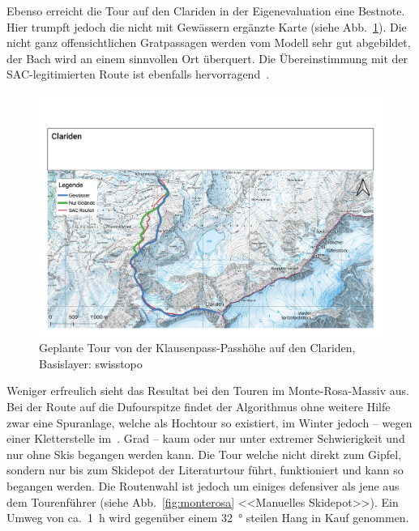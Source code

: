 
Ebenso erreicht die Tour auf den Clariden in der Eigenevaluation eine Bestnote. Hier trumpft jedoch die nicht mit Gewässern ergänzte Karte (siehe Abb.\ \ref{fig:clariden}). Die nicht ganz offensichtlichen Gratpassagen werden vom Modell sehr gut abgebildet, der Bach wird an einem sinnvollen Ort überquert. Die Übereinstimmung mit der SAC-legitimierten Route ist ebenfalls hervorragend~\cite{twslstgallappzll}.

\begin{figure}[ht]
  \centering
  \includegraphics[page=1,width=.9\linewidth]{./../evaluation/PDFs/Clariden.pdf}
  \caption{Geplante Tour von der Klausenpass-Passhöhe auf den Clariden, \\Basislayer: swisstopo}\label{fig:clariden}
\end{figure}


Weniger erfreulich sieht das Resultat bei den Touren im Monte-Rosa-Massiv aus. Bei der Route auf die Dufourspitze findet der Algorithmus ohne weitere Hilfe zwar eine Spuranlage, welche als Hochtour so existiert, im Winter jedoch -- wegen einer Kletterstelle im~. Grad -- kaum oder nur unter extremer Schwierigkeit und nur ohne Skis begangen werden kann. 
Die Tour welche nicht direkt zum Gipfel, sondern nur bis zum Skidepot der Literaturtour führt, funktioniert und kann so begangen werden. Die Routenwahl ist jedoch um einiges defensiver als jene aus dem Tourenführer (siehe Abb.\ \ref{fig:monterosa} <<Manuelles Skidepot>>). Ein Umweg von ca.\ \qty{1}{h} wird gegenüber einem \qty{32}{°} steilen Hang in Kauf genommen.

